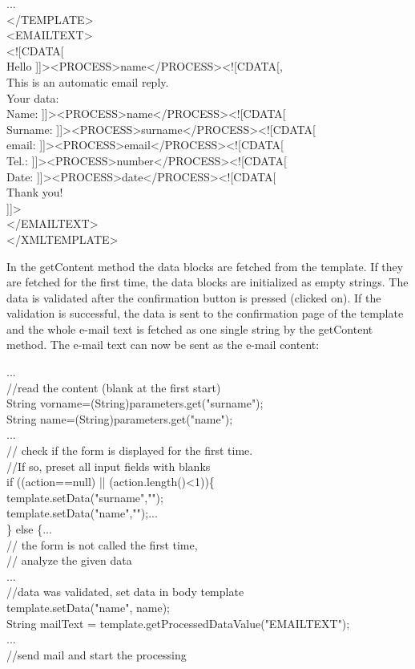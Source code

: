 \begin{java}
...\\
</TEMPLATE>\\
<EMAILTEXT>\\
<![CDATA[\\
Hello ]]><PROCESS>name</PROCESS><![CDATA[,\\
This is an automatic email reply.\\
Your data:\\
Name:           ]]><PROCESS>name</PROCESS><![CDATA[\\
Surname:        ]]><PROCESS>surname</PROCESS><![CDATA[\\
email:  ]]><PROCESS>email</PROCESS><![CDATA[\\
Tel.:           ]]><PROCESS>number</PROCESS><![CDATA[\\
Date:           ]]><PROCESS>date</PROCESS><![CDATA[\\
Thank you!\\
]]>\\
</EMAILTEXT>\\
</XMLTEMPLATE>\\
\end{java}

In the {\meth getContent} method the data blocks are fetched from the template.
If they are fetched for the first time, the data blocks are initialized
as empty strings. The data is validated after the confirmation button is
pressed (clicked on). If the validation is successful, the data is sent
to the confirmation page of the template and the whole e-mail text is
fetched as one single string by the {\meth getContent} method. The e-mail text
can now be sent as the e-mail content:

\begin{java}
...\\
//read the content (blank at the first start)\\
String vorname=(String)parameters.get("surname");\\
String name=(String)parameters.get("name");\\
...\\
// check if the form is displayed for the first time.\\
//If so, preset all input fields with blanks\\
if ((action==null) || (action.length()<1))\{\\
template.setData("surname","");\\
template.setData("name","");...\\
\} else \{...\\
// the form is not called the first time,\\
// analyze the given data\\
...\\
//data was validated, set data in body template\\
template.setData("name", name);\\
String mailText = template.getProcessedDataValue("EMAILTEXT");\\
...\\
//send mail and start the processing\\
\end{java}

